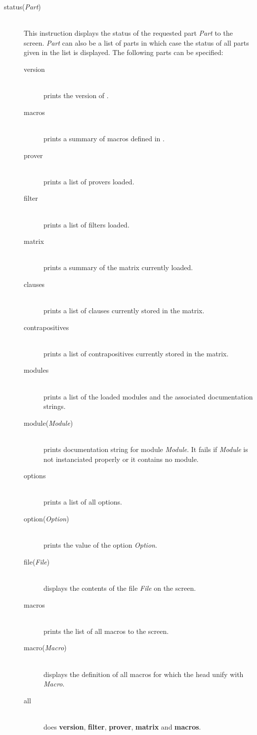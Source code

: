 \begin{description}
  \item [status({\em Part})]\ 
    \\
    This instruction displays the status of the requested part {\em Part} to
    the screen. {\em Part}\/ can also be a list of parts in which case the
    status of all parts given in the list is displayed. The following parts
    can be specified:
    \begin{description}
    \item [version]\ \\ prints the version of \ProTop.
    \item [macros]\ \\  prints a summary of macros defined in \ProTop.
    \item [prover]\ \\  prints a list of provers loaded.
    \item [filter]\ \\  prints a list of filters loaded.
    \item [matrix]\ \\  prints a summary of the matrix currently loaded.
    \item [clauses]\ \\ prints a list of clauses currently stored in the
      matrix.
    \item [contrapositives]\ \\ prints a list of contrapositives currently
      stored in the matrix.
    \item [modules]\ \\ prints a list of the loaded modules and the associated
      documentation strings.
    \item [module({\em Module}\/)]\ \\ prints documentation string for module
      {\em Module}. It fails if {\em Module}\/ is not instanciated properly or
      it contains no \ProTop{} module.
    \item [options]\ \\ prints a list of all options.
    \item [option({\em Option}\/)]\ \\ prints the value of the option {\em
        Option}. 
    \item [file({\em File}\/)]\ \\ displays the contents of the file {\em
        File} on the screen.
    \item [macros]\ \\ prints the list of all macros to the screen.
    \item [macro({\em Macro}\/)]\ \\ displays the definition of all macros for
      which the head unify with {\em Macro}.
    \item [all]\ \\     does {\bf version}, {\bf filter}, {\bf prover}, {\bf
        matrix} and {\bf macros}.
    \end{description}


\end{description}
